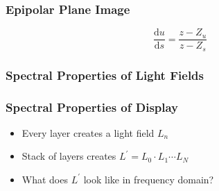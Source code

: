 \documentclass[12pt, compress]{beamer}
\begin{document}
\begin{frame}[fragile]
	\frametitle{Epipolar Plane Image}
	
	\begin{center}
		
		\hspace{1cm}
		
	\end{center}
	
	\begin{equation*}
		\frac{\text{d}u}{\text{d}s} = \frac{z - Z_u}{z - Z_s}
	\end{equation*}
	
\end{frame}

\begin{frame}[fragile]
	\frametitle{Spectral Properties of Light Fields}
	
	\begin{figure}
		
		\hspace{1cm}
	\end{figure}
\end{frame}

\begin{frame}[fragile]
	\frametitle{Spectral Properties of Display}
	
	\begin{itemize}
		\item Every layer creates a light field $L_n$
		\item Stack of layers creates $L^\prime = L_0 \cdot L_1 \cdots L_N$
		\item What does $L^\prime$ look like in frequency domain?
	\end{itemize}
	
	\begin{figure}
	\end{figure}
\end{frame}
\end{document}
